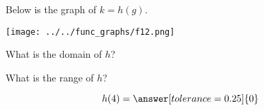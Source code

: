 \documentclass{ximera}
\author{Lee Wayand}
\begin{document}
\begin{exercise}  





Below is the graph of $k=h(g)$.  

\begin{image}
\texttt{[image: ../../func\_graphs/f12.png]}
\end{image}









\begin{question} 


What is the domain of $h$?\\


\begin{multipleChoice}
\choice {$[3, 9]$}
\choice [correct]{$[3, \infty)$}
\end{multipleChoice}

\end{question}






\begin{question} 


What is the range of $h$?\\


\begin{multipleChoice}
\choice {$[3, \infty)$}
\end{multipleChoice}


\end{question}









\begin{question} 



\[  h(4) = \answer[tolerance=0.25]{0}  \]

\end{question}










\begin{question} 




\end{question}
\end{exercise}
\end{document}
